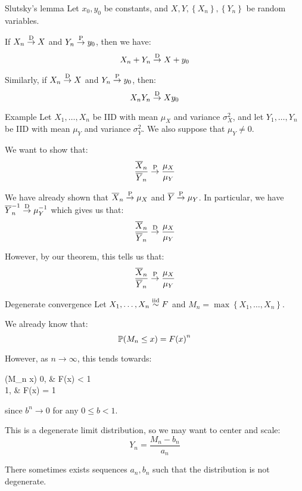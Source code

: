 \documentclass[a4paper]{article}
\begin{document}
\begin{parag}{Slutsky's lemma}
    Let $x_0, y_0$ be constants, and $X, Y, \left\{X_n\right\}, \left\{Y_n\right\}$ be random variables.

    If $X_n \over{\to}{D} X$ and $Y_n \over{\to}{P} y_0$, then we have: 
    \[X_n + Y_n \over{\to}{D} X + y_0\]
    
    Similarly, if $X_n \over{\to}{D} X$ and $Y_n \over{\to}{P} y_0$, then: 
    \[X_n Y_n \over{\to}{D} X y_0\]
\end{parag}

\begin{parag}{Example}
    Let $X_1, \ldots, X_n$ be IID with mean $\mu_X$ and variance $\sigma_X^2$, and let $Y_1, \ldots, Y_n$ be IID with mean $\mu_Y$ and variance $\sigma_Y^2$. We also suppose that $\mu_Y \neq 0$.

    We want to show that:
    \[\frac{\bar{X}_n}{\bar{Y}_n} \over{\to}{P} \frac{\mu_X}{\mu_Y}\]

    We have already shown that $\bar{X}_n \over{\to}{P} \mu_X$ and $\bar{Y} \over{\to}{P} \mu_Y$. In particular, we have $\bar{Y}^{-1}_n \over{\to}{D} \mu_Y^{-1}$ which gives us that: 
    \[\frac{\bar{X}_n}{\bar{Y}_n} \over{\to}{D} \frac{\mu_X}{\mu_Y}\]
    
    However, by our theorem, this tells us that:
    \[\frac{\bar{X}_n}{\bar{Y}_n} \over{\to}{P} \frac{\mu_X}{\mu_Y}\]
\end{parag}

\begin{parag}{Degenerate convergence}
    Let $X_1, \ldots, X_n \iid F$ and $M_n = \max\left\{X_1, \ldots, X_n\right\}$.

    We already know that: 
    \[\prob\left(M_n \leq x\right) = F\left(x\right)^n\]
    
    However, as $n \to \infty$, this tends towards:
    \begin{functionbypart}{\prob\left(M_n \leq x\right)}
        0, & F\left(x\right) < 1 \\
        1, & F\left(x\right) = 1
    \end{functionbypart}
    since $b^n \to 0$ for any $0 \leq b < 1$.

    This is a degenerate limit distribution, so we may want to center and scale: 
    \[Y_n = \frac{M_n - b_n}{a_n}\]
    
    There sometimes exists sequences $a_n, b_n$ such that the distribution is not degenerate.
\end{parag}
\end{document}
